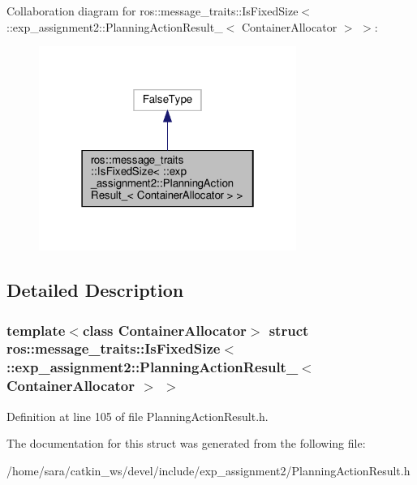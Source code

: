 Collaboration diagram for ros\+:\+:message\+\_\+traits\+:\+:Is\+Fixed\+Size$<$ \+:\+:exp\+\_\+assignment2\+:\+:Planning\+Action\+Result\+\_\+$<$ Container\+Allocator $>$ $>$\+:
\nopagebreak
\begin{figure}[H]
\begin{center}
\leavevmode
\includegraphics[width=238pt]{structros_1_1message__traits_1_1IsFixedSize_3_01_1_1exp__assignment2_1_1PlanningActionResult___36b3a6798958c1b0d12a8cde43c4ba9ce}
\end{center}
\end{figure}


\subsection{Detailed Description}
\subsubsection*{template$<$class Container\+Allocator$>$\newline
struct ros\+::message\+\_\+traits\+::\+Is\+Fixed\+Size$<$ \+::exp\+\_\+assignment2\+::\+Planning\+Action\+Result\+\_\+$<$ Container\+Allocator $>$ $>$}



Definition at line 105 of file Planning\+Action\+Result.\+h.



The documentation for this struct was generated from the following file\+:\begin{DoxyCompactItemize}
\item 
/home/sara/catkin\+\_\+ws/devel/include/exp\+\_\+assignment2/Planning\+Action\+Result.\+h\end{DoxyCompactItemize}
